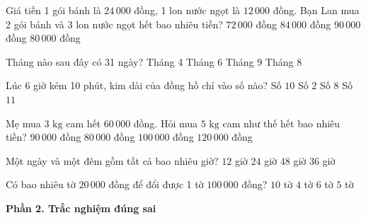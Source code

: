 \begin{ex} %
Giá tiền 1 gói bánh là $24\,000$ đồng, 1 lon nước ngọt là $12\,000$ đồng. Bạn Lan mua 2 gói bánh và 3 lon nước ngọt hết bao nhiêu tiền?
\choice
{$72\,000$ đồng}
{\True $84\,000$ đồng}
{$90\,000$ đồng}
{$80\,000$ đồng}
\end{ex}

\begin{ex} %
Tháng nào sau đây có 31 ngày?
\choice
{Tháng 4}
{Tháng 6}
{Tháng 9}
{\True Tháng 8}
\end{ex}

\begin{ex} %
Lúc 6 giờ kém 10 phút, kim dài của đồng hồ chỉ vào số nào?
\choice
{\True Số $10$}
{Số $2$}
{Số $8$}
{Số $11$}
\end{ex}

\begin{ex} %
Mẹ mua $3\text{ kg}$ cam hết $60\,000$ đồng. Hỏi mua $5\text{ kg}$ cam như thế hết bao nhiêu tiền?
\choice
{$90\,000$ đồng}
{$80\,000$ đồng}
{\True $100\,000$ đồng}
{$120\,000$ đồng}
\end{ex}

\begin{ex} %
Một ngày và một đêm gồm tất cả bao nhiêu giờ?
\choice
{$12$ giờ}
{\True $24$ giờ}
{$48$ giờ}
{$36$ giờ}
\end{ex}

\begin{ex} %
Có bao nhiêu tờ $20\,000$ đồng để đổi được 1 tờ $100\,000$ đồng?
\choice
{$10$ tờ}
{$4$ tờ}
{$6$ tờ}
{\True $5$ tờ}
\end{ex}

\textbf{Phần 2. Trắc nghiệm đúng sai}

